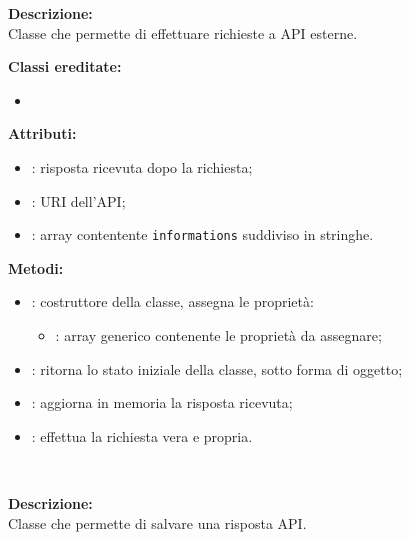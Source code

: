 \textbf{Descrizione:}\\
Classe che permette di effettuare richieste a API esterne.


\textbf{Classi ereditate:}
\begin{itemize}
	\item {}
\end{itemize}

\textbf{Attributi:}
\begin{itemize}
	\item {}: risposta ricevuta dopo la richiesta;
	\item {}: URI dell'API;
	\item {}: array contentente \texttt{informations} suddiviso in stringhe.
\end{itemize}

\textbf{Metodi:}
\begin{itemize}
	\item {}: costruttore della classe, assegna le proprietà:
	\begin{itemize}
		\item {}: array generico contenente le proprietà da assegnare;
	\end{itemize}
	\item {}: ritorna lo stato iniziale della classe, sotto forma di oggetto;
	\item {}: aggiorna in memoria la risposta ricevuta;
	\item {}: effettua la richiesta vera e propria.
\end{itemize}

\subsubparagraph[::ExternalAPIStore]{\class}\mbox{}\\ \label{\class}

\textbf{Descrizione:}\\
Classe che permette di salvare una risposta API.

